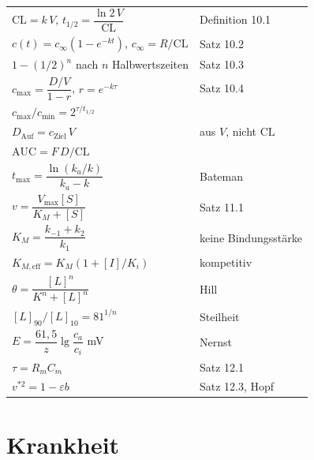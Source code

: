\begin{merksatz}
\begin{center}
{\small
\renewcommand{\arraystretch}{1.62}
\begin{tabular}{@{}P{4.4cm}P{4.2cm}@{}}
\toprule
$\mathrm{CL} = k\,V$, $t_{1/2} = \dfrac{\ln2\,V}{\mathrm{CL}}$ & Definition 10.1\\
$c(t) = c_\infty(1-e^{-kt})$, $c_\infty = R/\mathrm{CL}$ & Satz 10.2\\
$1-(1/2)^n$ nach $n$ Halbwertszeiten & Satz 10.3\\
$c_{\max} = \dfrac{D/V}{1-r}$, $r = e^{-k\tau}$ & Satz 10.4\\
$c_{\max}/c_{\min} = 2^{\tau/t_{1/2}}$ & \\
$D_{\text{Auf}} = c_{\text{Ziel}}\,V$ & aus $V$, nicht $\mathrm{CL}$\\
$\mathrm{AUC} = F\,D/\mathrm{CL}$ & \\
$t_{\max} = \dfrac{\ln(k_a/k)}{k_a-k}$ & Bateman\\
$v = \dfrac{V_{\max}[S]}{K_M+[S]}$ & Satz 11.1\\
$K_M = \dfrac{k_{-1}+k_2}{k_1}$ & keine Bindungsstärke\\
$K_{M,\text{eff}} = K_M(1+[I]/K_i)$ & kompetitiv\\
$\theta = \dfrac{[L]^n}{K^n+[L]^n}$ & Hill\\
$[L]_{90}/[L]_{10} = 81^{1/n}$ & Steilheit\\
$E = \dfrac{61{,}5}{z}\lg\dfrac{c_a}{c_i}$ mV & Nernst\\
$\tau = R_mC_m$ & Satz 12.1\\
$v^{*2} = 1-\varepsilon b$ & Satz 12.3, Hopf\\
\bottomrule
\end{tabular}}
\end{center}
\end{merksatz}

\section{Krankheit}

